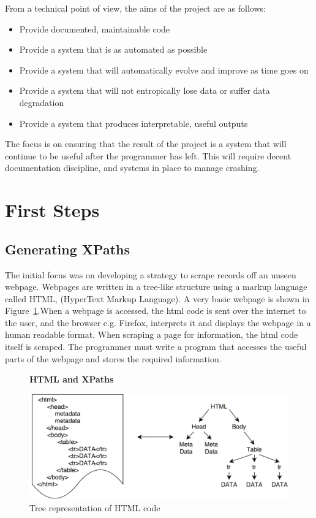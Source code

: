 \documentclass[11pt, oneside]{article}   	%
\begin{document}
From a technical point of view, the aims of the project are as follows:
\begin{itemize}
\item{Provide documented, maintainable code}
\item{Provide a system that is as automated as possible}
\item{Provide a system that will automatically evolve and improve as time goes on}
\item{Provide a system that will not entropically lose data or suffer data degradation}
\item{Provide a system that produces interpretable, useful outputs}
\end{itemize}
The focus is on ensuring that the result of the project is a system that will continue to be useful after the programmer has left. This will require decent documentation discipline, and systems in place to manage crashing.
\section{First Steps}
\subsection{Generating XPaths}
The initial focus was on developing a strategy to scrape records off an unseen webpage.
Webpages are written in a tree-like structure using a markup language called HTML, (HyperText Markup Language). A very basic webpage is shown in Figure~\ref{fig:HTMLTREE}.When a webpage is accessed, the html code is sent over the internet to the user, and the browser e.g. Firefox, interprets it and displays the webpage in a human readable format. When scraping a page for information, the html code itself is scraped. The programmer must  write a program that accesses the useful parts of the webpage and stores the required information. 
\begin{figure}[H]
    \centering
    \textbf{HTML and XPaths}\par\medskip
    \includegraphics[scale=0.3]{HTMLTREE2.png}
    \caption{Tree representation of HTML code\label{fig:HTMLTREE}}
\end{figure}
\end{document}
